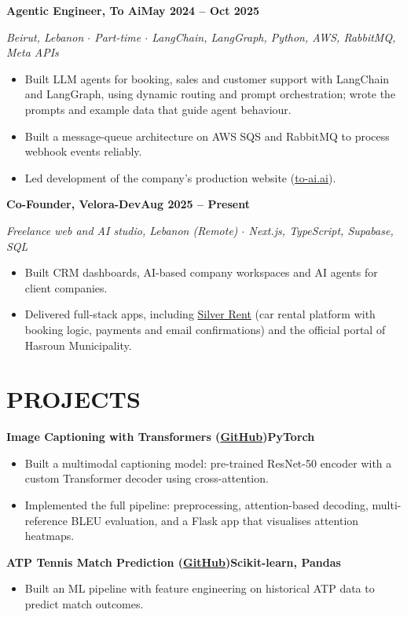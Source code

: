 \documentclass[10pt, a4paper]{article}
\newcommand{\entry}[2]{\vspace{5pt}\textbf{#1}\hfill\textbf{#2}\par}
\newcommand{\sub}[1]{\textit{#1}\par}
\begin{document}
\entry{Agentic Engineer, To Ai}{May 2024 -- Oct 2025}
\sub{Beirut, Lebanon $\cdot$ Part-time $\cdot$ LangChain, LangGraph, Python, AWS, RabbitMQ, Meta APIs}
\begin{itemize}
    \item Built LLM agents for booking, sales and customer support with LangChain and LangGraph, using dynamic routing and prompt orchestration; wrote the prompts and example data that guide agent behaviour.
    \item Built a message-queue architecture on AWS SQS and RabbitMQ to process webhook events reliably.
    \item Led development of the company's production website (\href{https://to-ai.ai}{to-ai.ai}).
\end{itemize}

\entry{Co-Founder, Velora-Dev}{Aug 2025 -- Present}
\sub{Freelance web and AI studio, Lebanon (Remote) $\cdot$ Next.js, TypeScript, Supabase, SQL}
\begin{itemize}
    \item Built CRM dashboards, AI-based company workspaces and AI agents for client companies.
    \item Delivered full-stack apps, including \href{https://www.silver-rent.be}{Silver Rent} (car rental platform with booking logic, payments and email confirmations) and the official portal of Hasroun Municipality.
\end{itemize}

\section*{PROJECTS}
\entry{Image Captioning with Transformers (\href{https://github.com/Farrous05/image-caption-transformer}{GitHub})}{PyTorch}
\begin{itemize}
    \item Built a multimodal captioning model: pre-trained ResNet-50 encoder with a custom Transformer decoder using cross-attention.
    \item Implemented the full pipeline: preprocessing, attention-based decoding, multi-reference BLEU evaluation, and a Flask app that visualises attention heatmaps.
\end{itemize}

\entry{ATP Tennis Match Prediction (\href{https://github.com/Farrous05/atp-tennis-ml}{GitHub})}{Scikit-learn, Pandas}
\begin{itemize}
    \item Built an ML pipeline with feature engineering on historical ATP data to predict match outcomes.
\end{itemize}
\end{document}

